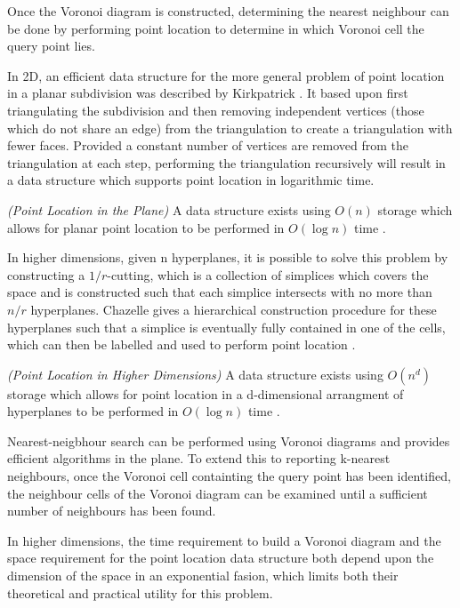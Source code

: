 \documentclass[mcs]{scsthesis}
\begin{document}
Once the Voronoi diagram is constructed, determining the nearest neighbour can
be done by performing point location to determine in which Voronoi cell the
query point lies.

In 2D, an efficient data structure for the more general problem of point
location in a planar subdivision was described by Kirkpatrick
\cite{kirkpatrick}. It based upon first triangulating the subdivision and then
removing independent vertices (those which do not share an edge) from the
triangulation to create a triangulation with fewer faces. Provided a constant
number of vertices are removed from the triangulation at each step, performing
the triangulation recursively will result in a data structure which supports
point location in logarithmic time.

\begin{thm} \emph{(Point Location in the Plane)}
A data structure exists using \(O(n)\) storage which allows for planar
point location to be performed in \(O(\log n)\) time \cite{kirkpatrick}.
\end{thm}

In higher dimensions, given n hyperplanes, it is possible to solve this problem
by constructing a \(1/r\)-cutting, which is a collection of simplices which
covers the space and is constructed such that each simplice intersects with no
more than \(n/r\) hyperplanes. Chazelle gives a hierarchical construction
procedure for these hyperplanes such that a simplice is eventually fully
contained in one of the cells, which can then be labelled and used to perform
point location \cite{chazelle}.

\begin{thm} \emph{(Point Location in Higher Dimensions)}
A data structure exists using \(O(n^d)\) storage which allows for  
point location in a d-dimensional arrangment of hyperplanes to be performed in
\(O(\log n)\) time \cite{chazelle}.
\end{thm}

Nearest-neigbhour search can be performed using Voronoi diagrams and provides
efficient algorithms in the plane. To extend this to reporting k-nearest
neighbours, once the Voronoi cell containting the query point has been
identified, the neighbour cells of the Voronoi diagram can be examined until
a sufficient number of neighbours has been found. 

In higher dimensions, the time requirement to build a Voronoi diagram and the
space requirement for the point location data structure both depend upon the
dimension of the space in an exponential fasion, which limits both their
theoretical and practical utility for this problem.
\end{document}
